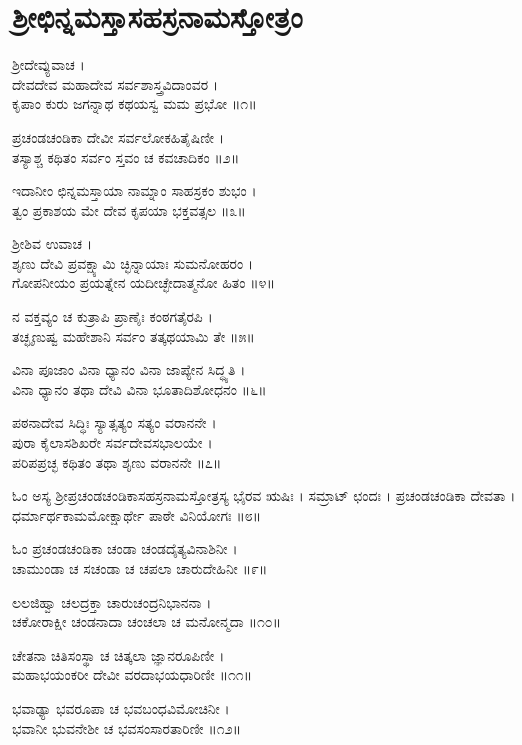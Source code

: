 
\section{ಶ್ರೀಛಿನ್ನಮಸ್ತಾಸಹಸ್ರನಾಮಸ್ತೋತ್ರಂ}

ಶ್ರೀದೇವ್ಯುವಾಚ ।\\
ದೇವದೇವ ಮಹಾದೇವ ಸರ್ವಶಾಸ್ತ್ರವಿದಾಂವರ ।\\
ಕೃಪಾಂ ಕುರು ಜಗನ್ನಾಥ ಕಥಯಸ್ವ ಮಮ ಪ್ರಭೋ ॥೧॥

ಪ್ರಚಂಡಚಂಡಿಕಾ ದೇವೀ ಸರ್ವಲೋಕಹಿತೈಷಿಣೀ ।\\
ತಸ್ಯಾಶ್ಚ ಕಥಿತಂ ಸರ್ವಂ ಸ್ತವಂ ಚ ಕವಚಾದಿಕಂ ॥೨॥

ಇದಾನೀಂ ಛಿನ್ನಮಸ್ತಾಯಾ ನಾಮ್ನಾಂ ಸಾಹಸ್ರಕಂ ಶುಭಂ ।\\
ತ್ವಂ ಪ್ರಕಾಶಯ ಮೇ ದೇವ ಕೃಪಯಾ ಭಕ್ತವತ್ಸಲ ॥೩॥

ಶ್ರೀಶಿವ ಉವಾಚ ।\\
ಶೃಣು ದೇವಿ ಪ್ರವಕ್ಷ್ಯಾಮಿ ಚ್ಛಿನ್ನಾಯಾಃ ಸುಮನೋಹರಂ ।\\
ಗೋಪನೀಯಂ ಪ್ರಯತ್ನೇನ ಯದೀಚ್ಛೇದಾತ್ಮನೋ ಹಿತಂ ॥೪॥

ನ ವಕ್ತವ್ಯಂ ಚ ಕುತ್ರಾಪಿ ಪ್ರಾಣೈಃ ಕಂಠಗತೈರಪಿ ।\\
ತಚ್ಛೃಣುಷ್ವ ಮಹೇಶಾನಿ ಸರ್ವಂ ತತ್ಕಥಯಾಮಿ ತೇ ॥೫॥

ವಿನಾ ಪೂಜಾಂ ವಿನಾ ಧ್ಯಾನಂ ವಿನಾ ಜಾಪ್ಯೇನ ಸಿದ್ಧ್ಯತಿ ।\\
ವಿನಾ ಧ್ಯಾನಂ ತಥಾ ದೇವಿ ವಿನಾ ಭೂತಾದಿಶೋಧನಂ ॥೬॥

ಪಠನಾದೇವ ಸಿದ್ಧಿಃ ಸ್ಯಾತ್ಸತ್ಯಂ ಸತ್ಯಂ ವರಾನನೇ ।\\
ಪುರಾ ಕೈಲಾಸಶಿಖರೇ ಸರ್ವದೇವಸಭಾಲಯೇ ।\\
ಪರಿಪಪ್ರಚ್ಛ ಕಥಿತಂ ತಥಾ ಶೃಣು ವರಾನನೇ ॥೭॥

ಓಂ ಅಸ್ಯ ಶ್ರೀಪ್ರಚಂಡಚಂಡಿಕಾಸಹಸ್ರನಾಮಸ್ತೋತ್ರಸ್ಯ ಭೈರವ ಋಷಿಃ  । ಸಮ್ರಾಟ್ ಛಂದಃ  । ಪ್ರಚಂಡಚಂಡಿಕಾ ದೇವತಾ  । ಧರ್ಮಾರ್ಥಕಾಮಮೋಕ್ಷಾರ್ಥೇ ಪಾಠೇ ವಿನಿಯೋಗಃ ॥೮॥

ಓಂ ಪ್ರಚಂಡಚಂಡಿಕಾ ಚಂಡಾ ಚಂಡದೈತ್ಯವಿನಾಶಿನೀ ।\\
ಚಾಮುಂಡಾ ಚ ಸಚಂಡಾ ಚ ಚಪಲಾ ಚಾರುದೇಹಿನೀ ॥೯॥

ಲಲಜಿಹ್ವಾ ಚಲದ್ರಕ್ತಾ ಚಾರುಚಂದ್ರನಿಭಾನನಾ ।\\
ಚಕೋರಾಕ್ಷೀ ಚಂಡನಾದಾ ಚಂಚಲಾ ಚ ಮನೋನ್ಮದಾ ॥೧೦॥

ಚೇತನಾ ಚಿತಿಸಂಸ್ಥಾ ಚ ಚಿತ್ಕಲಾ ಜ್ಞಾನರೂಪಿಣೀ ।\\
ಮಹಾಭಯಂಕರೀ ದೇವೀ ವರದಾಭಯಧಾರಿಣೀ ॥೧೧॥

ಭವಾಢ್ಯಾ ಭವರೂಪಾ ಚ ಭವಬಂಧವಿಮೋಚಿನೀ ।\\
ಭವಾನೀ ಭುವನೇಶೀ ಚ ಭವಸಂಸಾರತಾರಿಣೀ ॥೧೨॥

